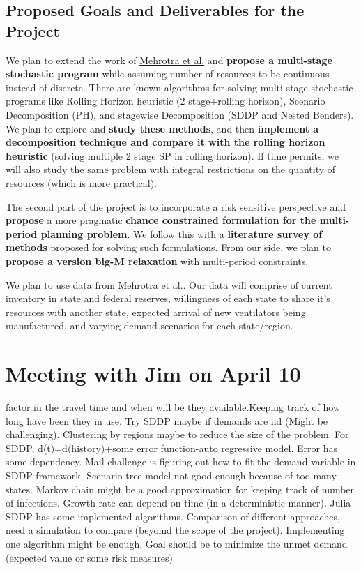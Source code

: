 \documentclass[11pt,letterpaper]{article}
\begin{document}
\subsection*{Proposed Goals and Deliverables for the Project}
We plan to extend the work of \href{http://www.optimization-online.org/DB_FILE/2020/04/7719.pdf}{Mehrotra et al.} and \textbf{propose a multi-stage stochastic program} while assuming number of resources to be continuous instead of discrete. 
There are known algorithms for solving multi-stage stochastic programs like Rolling Horizon heuristic (2 stage+rolling horizon), Scenario Decomposition (PH), and stagewise Decomposition (SDDP and Nested Benders). We plan to explore and \textbf{study these methods}, and then \textbf{implement a decomposition technique and compare it with the rolling horizon heuristic} (solving multiple 2 stage SP in rolling horizon). If time permits, we will also study the same problem with integral restrictions on the quantity of resources (which is more practical). %

The second part of the project is to incorporate a risk sensitive perspective and \textbf{propose} a more pragmatic \textbf{chance constrained formulation for the multi-period planning problem}. We follow this with a \textbf{literature survey of methods} proposed for solving such formulations. From our side, we plan to \textbf{propose a version big-M relaxation} with multi-period constraints.    

We plan to use data from \href{https://pubsonline.informs.org/doi/pdf/10.1287/trsc.2017.0777}{Mehrotra et al.}. Our data will comprise of current inventory in state and federal reserves, willingness of each state to share it's resources with another state, expected arrival of new ventilators being manufactured, and varying demand scenarios for each state/region.
 \section*{Meeting with Jim on April 10}
factor in the travel time and when will be they available.Keeping track of how long have been they in use. Try SDDP maybe if demands are iid (Might be challenging). Clustering by regions maybe to reduce the size of the problem. For SDDP, d(t)=d(history)+some error function-auto regressive model. Error has some dependency. Mail challenge is figuring out how to fit the demand variable in SDDP framework. Scenario tree model not good enough because of too many states.
Markov chain might be a good approximation for keeping track of number of infections. Growth rate can depend on time (in a deterministic manner). Julia SDDP has some implemented algorithms. Comparison of different approaches, need a simulation to compare (beyomd the scope of the project). Implementing one algorithm might be enough. Goal should be to minimize the unmet demand (expected value or some risk measures)
\end{document}
